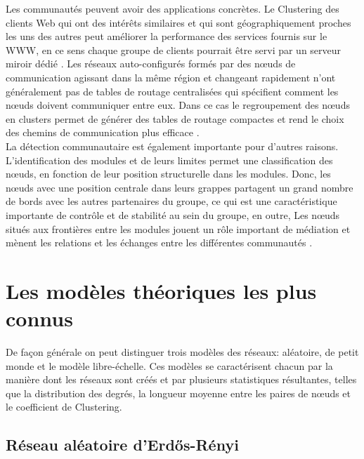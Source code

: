Les communautés peuvent avoir des applications concrètes. Le Clustering des clients Web qui ont des intérêts similaires et qui sont géographiquement proches les uns des autres peut améliorer la performance des services fournis sur le WWW, en ce sens chaque groupe de clients pourrait être servi par un serveur miroir dédié \cite{KriW2000}.
Les réseaux auto-configurés formés par des nœuds de communication agissant dans la même région et changeant rapidement n'ont généralement pas de tables de routage centralisées qui spécifient comment les nœuds doivent communiquer entre eux.
Dans ce cas le regroupement des nœuds en clusters permet de générer des tables de routage compactes et rend le choix des chemins de communication plus efficace \cite{Steen2001}.\\
La détection communautaire est également importante pour d'autres raisons. L'identification des modules et de leurs limites permet une classification des nœuds, en fonction de leur position structurelle dans les modules. Donc, les nœuds avec une position centrale dans leurs grappes partagent un grand nombre de bords avec les autres partenaires du groupe, ce qui est une caractéristique importante de contrôle et de stabilité au sein du groupe, en outre, Les nœuds situés aux frontières entre les modules jouent un rôle important de médiation et mènent les relations et les échanges entre les différentes communautés \cite{Csermely2008}.

\section{Les modèles théoriques les plus connus} 

De façon générale on peut distinguer trois modèles des réseaux: aléatoire, de petit monde et le modèle libre-échelle. Ces modèles se caractérisent chacun par la manière dont les réseaux sont créés et par plusieurs statistiques résultantes, telles que la distribution des degrés, la longueur moyenne entre les paires de nœuds et le coefficient de Clustering.

   \subsection{Réseau aléatoire d'Erd\H{o}s-Rényi}
   

